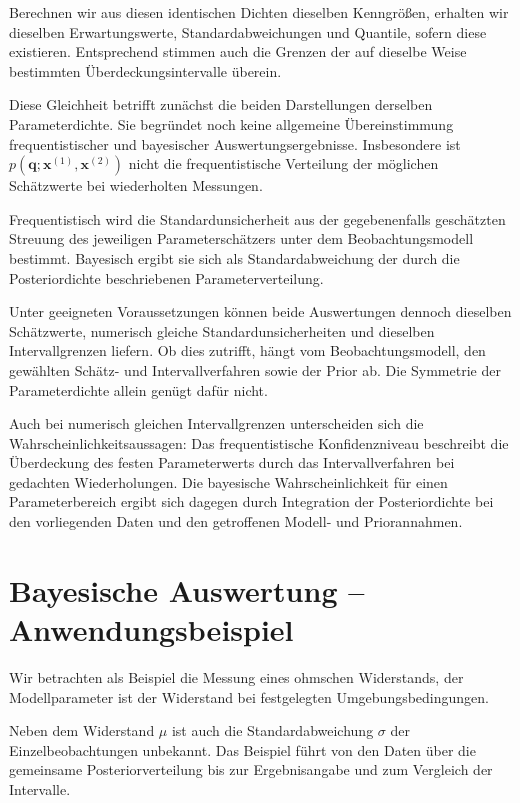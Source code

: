 Berechnen wir aus diesen identischen Dichten dieselben
Kenngrößen, erhalten wir dieselben Erwartungswerte,
Standardabweichungen und Quantile, sofern diese existieren.
Entsprechend stimmen auch die Grenzen der auf dieselbe
Weise bestimmten Überdeckungsintervalle überein.

Diese Gleichheit betrifft zunächst die beiden Darstellungen
derselben Parameterdichte. Sie begründet noch keine
allgemeine Übereinstimmung frequentistischer und bayesischer
Auswertungsergebnisse. Insbesondere ist
$p(\mathbf q;\mathbf x^{(1)},\mathbf x^{(2)})$
nicht die frequentistische Verteilung der möglichen
Schätzwerte bei wiederholten Messungen.

Frequentistisch wird die Standardunsicherheit aus der
gegebenenfalls geschätzten Streuung des jeweiligen
Parameterschätzers unter dem Beobachtungsmodell bestimmt.
Bayesisch ergibt sie sich als Standardabweichung der
durch die Posteriordichte beschriebenen Parameterverteilung.

Unter geeigneten Voraussetzungen können beide Auswertungen
dennoch dieselben Schätzwerte, numerisch gleiche
Standardunsicherheiten und dieselben Intervallgrenzen liefern.
Ob dies zutrifft, hängt vom Beobachtungsmodell, den gewählten
Schätz- und Intervallverfahren sowie der Prior ab.
Die Symmetrie der Parameterdichte allein genügt dafür nicht.

Auch bei numerisch gleichen Intervallgrenzen unterscheiden
sich die Wahrscheinlichkeitsaussagen:
Das frequentistische Konfidenzniveau beschreibt die
Überdeckung des festen Parameterwerts durch das
Intervallverfahren bei gedachten Wiederholungen.
Die bayesische Wahrscheinlichkeit für einen Parameterbereich
ergibt sich dagegen durch Integration der Posteriordichte
bei den vorliegenden Daten und den getroffenen Modell-
und Priorannahmen.

\section{Bayesische Auswertung -- Anwendungsbeispiel}
\label{V4Lehrbeispiel}

Wir betrachten als Beispiel die Messung eines ohmschen Widerstands, der 
Modellparameter ist der Widerstand bei festgelegten Umgebungsbedingungen.

Neben dem Widerstand $\mu$ ist auch die Standardabweichung $\sigma$ der Einzelbeobachtungen unbekannt.
Das Beispiel führt von den Daten über die gemeinsame Posteriorverteilung
bis zur Ergebnisangabe und zum Vergleich der Intervalle.

